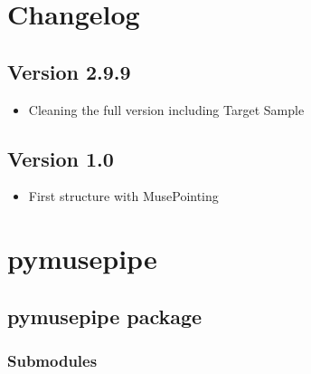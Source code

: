 \documentclass[letterpaper,10pt,english]{sphinxmanual}
\begin{document}
\sphinxstepscope


\section{Changelog}
\label{\detokenize{changelog:changelog}}\label{\detokenize{changelog:changes}}\label{\detokenize{changelog::doc}}

\subsection{Version 2.9.9}
\label{\detokenize{changelog:version-2-9-9}}\begin{itemize}
\item {} 
\sphinxAtStartPar
Cleaning the full version including Target Sample

\end{itemize}


\subsection{Version 1.0}
\label{\detokenize{changelog:version-1-0}}\begin{itemize}
\item {} 
\sphinxAtStartPar
First structure with MusePointing

\end{itemize}

\sphinxstepscope


\section{pymusepipe}
\label{\detokenize{api/modules:pymusepipe}}\label{\detokenize{api/modules::doc}}
\sphinxstepscope


\subsection{pymusepipe package}
\label{\detokenize{api/pymusepipe:pymusepipe-package}}\label{\detokenize{api/pymusepipe::doc}}

\subsubsection{Submodules}
\label{\detokenize{api/pymusepipe:submodules}}
\end{document}
